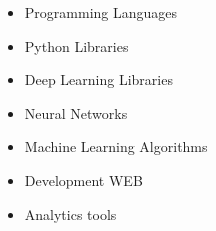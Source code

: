 

\begin{itemize}
\item \textcolor{emphasis}{Programming Languages} 
\end{itemize}


\divider\smallskip

\begin{itemize}
    \item \textcolor{emphasis}{Python Libraries}
    \end{itemize}
    
    \divider\smallskip
    
\begin{itemize}
    \item \textcolor{emphasis}{Deep Learning Libraries}
    \end{itemize}
    
    \divider\smallskip

\begin{itemize}
        \item \textcolor{emphasis}{Neural Networks}    
\end{itemize}
    
\divider\smallskip

        \begin{itemize}
            \item \textcolor{emphasis}{Machine Learning Algorithms}    
    \end{itemize}

    \divider\smallskip

    \begin{itemize}
\item \textcolor{emphasis}{Development WEB}
\end{itemize}

\divider\smallskip

\begin{itemize}
\item \textcolor{emphasis}{Analytics tools}
\end{itemize}

